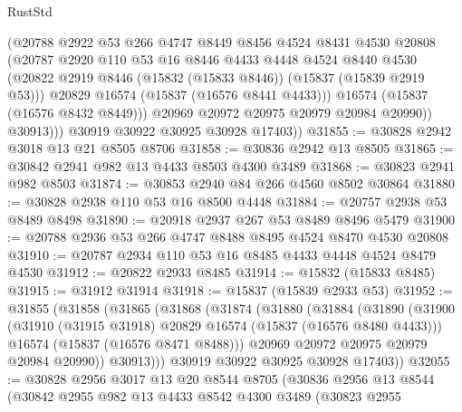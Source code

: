 \begin{lexlean}{RustStd}
\begin{coremodule}
{\begin{coremodule}
{{{{{{{{{{{{{{{{{{{{{{{{{{{{{{{{{{{{{{{{{{{{{{{{{{{{{{{{{{{{                  (@20788
                    @2922
                    @53
                    @266
                    @4747
                    @8449
                    @8456
                    @4524
                    @8431
                    @4530
                    @20808
                    (@20787
                      @2920
                      @110
                      @53
                      @16
                      @8446
                      @4433
                      @4448
                      @4524
                      @8440
                      @4530
                      (@20822 @2919 @8446 (@15832 (@15833 @8446)) (@15837 (@15839 @2919 @53)))
                      @20829
                      @16574
                      (@15837 (@16576 @8441 @4433)))
                    @16574
                    (@15837 (@16576 @8432 @8449)))
                  @20969
                  @20972
                  @20975
                  @20979
                  @20984
                  @20990))
              @30913)))
        @30919
        @30922
        @30925
        @30928
        @17403))
@31855 := @30828 @2942 @3018 @13 @21 @8505 @8706
@31858 := @30836 @2942 @13 @8505
@31865 := @30842 @2941 @982 @13 @4433 @8503 @4300 @3489
@31868 := @30823 @2941 @982 @8503
@31874 := @30853 @2940 @84 @266 @4560 @8502 @30864
@31880 := @30828 @2938 @110 @53 @16 @8500 @4448
@31884 := @20757 @2938 @53 @8489 @8498
@31890 := @20918 @2937 @267 @53 @8489 @8496 @5479
@31900 := @20788 @2936 @53 @266 @4747 @8488 @8495 @4524 @8470 @4530 @20808
@31910 := @20787 @2934 @110 @53 @16 @8485 @4433 @4448 @4524 @8479 @4530
@31912 := @20822 @2933 @8485
@31914 := @15832 (@15833 @8485)
@31915 := @31912 @31914
@31918 := @15837 (@15839 @2933 @53)
@31952 := @31855
    (@31858
      (@31865
        (@31868
          (@31874
            (@31880
              (@31884
                (@31890
                  (@31900
                    (@31910 (@31915 @31918) @20829 @16574 (@15837 (@16576 @8480 @4433)))
                    @16574
                    (@15837 (@16576 @8471 @8488)))
                  @20969
                  @20972
                  @20975
                  @20979
                  @20984
                  @20990))
              @30913)))
        @30919
        @30922
        @30925
        @30928
        @17403))
@32055 := @30828
    @2956
    @3017
    @13
    @20
    @8544
    @8705
    (@30836
      @2956
      @13
      @8544
      (@30842
        @2955
        @982
        @13
        @4433
        @8542
        @4300
        @3489
        (@30823
          @2955
}}}}}}}}}}}}}}}}}}}}}}}}}}}}}}}}}}}}}}}}}}}}}}}}}}}}}}}}}}}}
\end{coremodule}}
\end{coremodule}
\end{lexlean}
